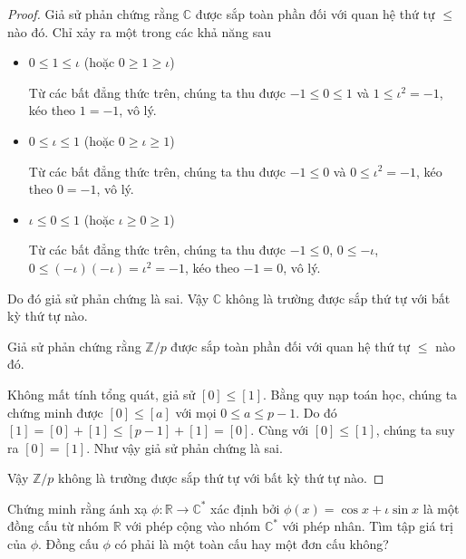\begin{proof}
    Giả sử phản chứng rằng $\mathbb{C}$ được sắp toàn phần đối với quan hệ thứ tự $\leq$ nào đó. Chỉ xảy ra một trong các khả năng sau
    \begin{itemize}
        \item $0\leq 1\leq \iota$ (hoặc $0\geq 1\geq \iota$)

              Từ các bất đẳng thức trên, chúng ta thu được $-1\leq 0\leq 1$ và $1\leq \iota^{2} = - 1$, kéo theo $1 = -1$, vô lý.
        \item $0\leq \iota\leq 1$ (hoặc $0\geq \iota\geq 1$)

              Từ các bất đẳng thức trên, chúng ta thu được $-1\leq 0$ và $0\leq \iota^{2} = -1$, kéo theo $0 = -1$, vô lý.
        \item $\iota\leq 0\leq 1$ (hoặc $\iota\geq 0\geq 1$)

              Từ các bất đẳng thức trên, chúng ta thu được $-1\leq 0$, $0\leq -\iota$, $0\leq (-\iota)(-\iota) = \iota^{2} = -1$, kéo theo $-1 = 0$, vô lý.
    \end{itemize}

    Do đó giả sử phản chứng là sai. Vậy $\mathbb{C}$ không là trường được sắp thứ tự với bất kỳ thứ tự nào.

    \bigskip
    Giả sử phản chứng rằng $\mathbb{Z}/p$ được sắp toàn phần đối với quan hệ thứ tự $\leq$ nào đó.

    Không mất tính tổng quát, giả sử $[0]\leq [1]$. Bằng quy nạp toán học, chúng ta chứng minh được $[0]\leq [a]$ với mọi $0\leq a\leq p-1$. Do đó $[1] = [0] + [1] \leq [p-1] + [1] = [0]$. Cùng với $[0]\leq [1]$, chúng ta suy ra $[0] = [1]$. Như vậy giả sử phản chứng là sai.

    Vậy $\mathbb{Z}/p$ không là trường được sắp thứ tự với bất kỳ thứ tự nào.
\end{proof}

\begin{exercise}
    Chứng minh rằng ánh xạ $\phi: \mathbb{R}\rightarrow\mathbb{C}^{*}$ xác định bởi $\phi(x) = \cos x + \iota\sin x$ là một đồng cấu từ nhóm $\mathbb{R}$ với phép cộng vào nhóm $\mathbb{C}^{*}$ với phép nhân. Tìm tập giá trị của $\phi$. Đồng cấu $\phi$ có phải là một toàn cấu hay một đơn cấu không?
\end{exercise}

